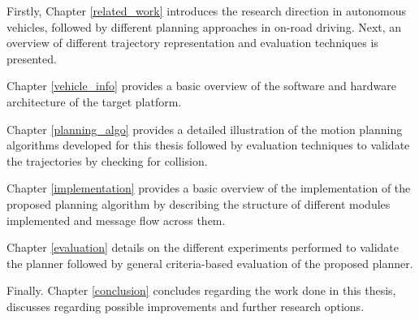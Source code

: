 Firstly, Chapter \ref{related_work} introduces the research direction in autonomous vehicles, followed by different planning approaches in on-road driving. Next, an overview of different trajectory representation and evaluation techniques is presented.

Chapter \ref{vehicle_info} provides a basic overview of the software and hardware architecture of the target platform.

Chapter \ref{planning_algo} provides a detailed illustration of the motion planning algorithms developed for this thesis followed by evaluation techniques to validate the trajectories by checking for collision.

Chapter \ref{implementation} provides a basic overview of the implementation of the proposed planning algorithm by describing the structure of different modules implemented and message flow across them.

Chapter \ref{evaluation} details on the different experiments performed to validate the planner followed by general criteria-based evaluation of the proposed planner.

Finally. Chapter \ref{conclusion} concludes regarding the work done in this thesis, discusses regarding possible improvements and further research options.
